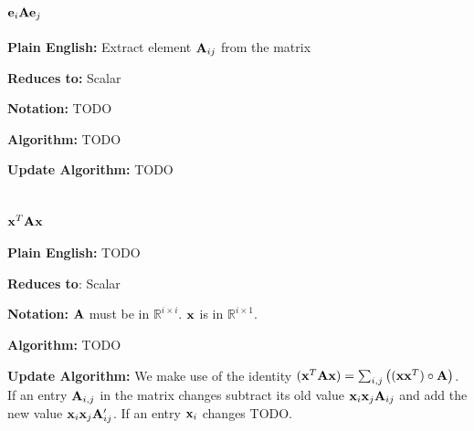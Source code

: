 \section{$\mathbf{e}_i \mathbf{A} \mathbf{e}_j$}

\textbf{Plain English:} Extract element $\mathbf{A}_{ij}$ from the matrix

\textbf{Reduces to:} Scalar

\textbf{Notation:} TODO

\textbf{Algorithm:} TODO

\textbf{Update Algorithm:} TODO


\section{$\mathbf{x}^T \mathbf{A} \mathbf{x}$}

\textbf{Plain English:} TODO

\textbf{Reduces to}: Scalar

\textbf{Notation:} $\mathbf{A}$ must be in $\mathbb{R}^{i\times i}$. $\mathbf{x}$ is in $\mathbb{R}^{i \times 1}$.

\textbf{Algorithm:} TODO

\textbf{Update Algorithm:} We make use of the identity $(\mathbf{x}^T \mathbf{A} \mathbf{x})=\sum_{i,j}\big((\mathbf{x} \mathbf{x}^T)\circ\mathbf{A}\big)$. If an entry $\mathbf{A}_{i,j}$ in the matrix changes subtract its old value $\mathbf{x}_i \mathbf{x}_j \mathbf{A}_{ij}$ and add the new value $\mathbf{x}_i \mathbf{x}_j \mathbf{A}_{ij}'$. If an entry $\mathbf{x}_i$ changes TODO.

